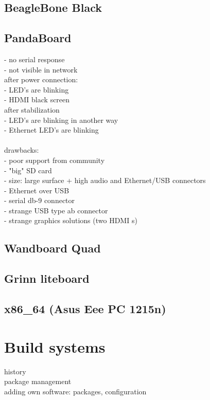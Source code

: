 \documentclass[printmode]{mgr}
\begin{document}
\section{BeagleBone Black}

\section{PandaBoard}

- no serial response\\
- not visible in network\\
after power connection:\\
- LED's are blinking\\
- HDMI black screen\\
after stabilization\\
- LED's are blinking in another way\\
- Ethernet LED's are blinking\\
\\
drawbacks:\\
- poor support from community\\
- "big" SD card\\
- size: large surface + high audio and Ethernet/USB connectors\\
- Ethernet over USB\\
- serial db-9 connector\\
- strange USB type ab connector\\
- strange graphics solutions (two HDMI s)\\

\section{Wandboard Quad}

\section{Grinn liteboard}

\section{x86\_64 (Asus Eee PC 1215n)}

\chapter{Build systems}
\label{chapter:build systems}

history\\
package management\\
adding own software: packages, configuration\\
\end{document}
